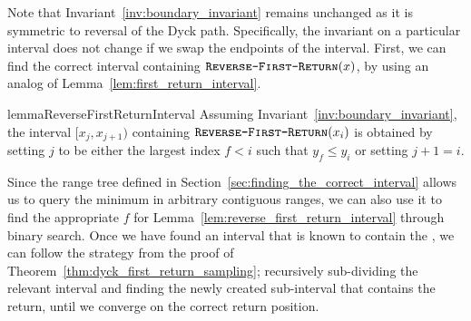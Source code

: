 Note that Invariant~\ref{inv:boundary_invariant} remains unchanged as it is symmetric to reversal of the Dyck path.
Specifically, the invariant on a particular interval does not change if we swap the endpoints of the interval.
First, we can find the correct interval containing $\texttt{\textsc{Reverse-First-Return}}(x)$, by using an analog of Lemma~\ref{lem:first_return_interval}.
\begin{restatable}{lemma}{ReverseFirstReturnInterval}
\label{lem:reverse_first_return_interval}
Assuming Invariant~\ref{inv:boundary_invariant}, the interval $[x_{j},x_{j+1})$ containing $\texttt{\textsc{Reverse-First-Return}}(x_i)$
is obtained by setting $j$ to be either the largest index $f<i$ such that $y_f\le y_i$ or setting $j+1=i$.
\end{restatable}
Since the range tree defined in Section~\ref{sec:finding_the_correct_interval} allows us to query the minimum in arbitrary contiguous ranges,
we can also use it to find the appropriate $f$ for Lemma~\ref{lem:reverse_first_return_interval} through binary search.
Once we have found an interval that is known to contain the ,
we can follow the strategy from the proof of Theorem~\ref{thm:dyck_first_return_sampling};
recursively sub-dividing the relevant interval and finding the newly created sub-interval that contains the return,
until we converge on the correct return position.
